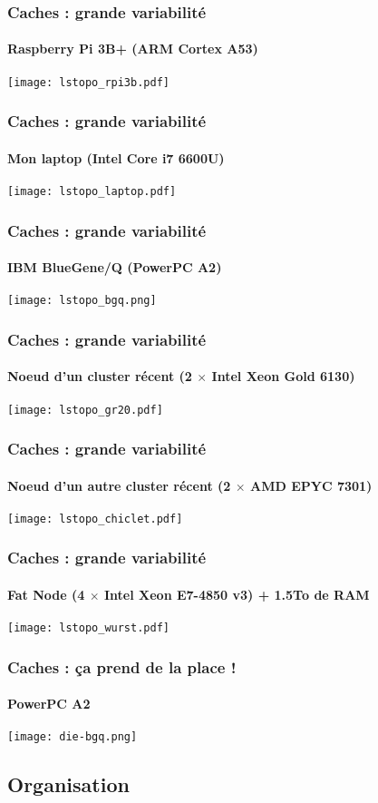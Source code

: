 \documentclass[xcolor={x11names,svgnames}]{beamer}
\begin{document}

\begin{frame}[label=caches]
\frametitle{Caches : grande variabilité}
\framesubtitle{Raspberry Pi 3B+ (ARM Cortex A53)}

  \centering
  \texttt{[image: lstopo\_rpi3b.pdf]}
\end{frame}

\begin{frame}[label=caches]
  \frametitle{Caches : grande variabilité}
  \framesubtitle{Mon laptop  (Intel Core i7 6600U)}
  \centering
  \texttt{[image: lstopo\_laptop.pdf]}
\end{frame}
  
\begin{frame}[label=caches]
  \frametitle{Caches : grande variabilité}
  \framesubtitle{IBM BlueGene/Q (PowerPC A2)}
  \centering
  \texttt{[image: lstopo\_bgq.png]}
\end{frame}

\begin{frame}[label=caches]
  \frametitle{Caches : grande variabilité}
  \framesubtitle{Noeud d'un cluster récent (2 $\times$ Intel Xeon Gold 6130)}
  \centering
  \texttt{[image: lstopo\_gr20.pdf]}
\end{frame}

\begin{frame}[label=caches]
  \frametitle{Caches : grande variabilité}
  \framesubtitle{Noeud d'un autre cluster récent (2 $\times$ AMD EPYC 7301)}
  \centering
  \texttt{[image: lstopo\_chiclet.pdf]}
\end{frame}

\begin{frame}[label=caches]
  \frametitle{Caches : grande variabilité}
  \framesubtitle{Fat Node (4 $\times$ Intel Xeon E7-4850 v3) + 1.5To de RAM}
  \centering
  \texttt{[image: lstopo\_wurst.pdf]}
\end{frame}

\begin{frame}[label=caches]
  \frametitle{Caches : ça prend de la place !}
  \framesubtitle{PowerPC A2}
  \centering
  \texttt{[image: die-bgq.png]}
\end{frame}


\subsection{Organisation}
\end{document}
